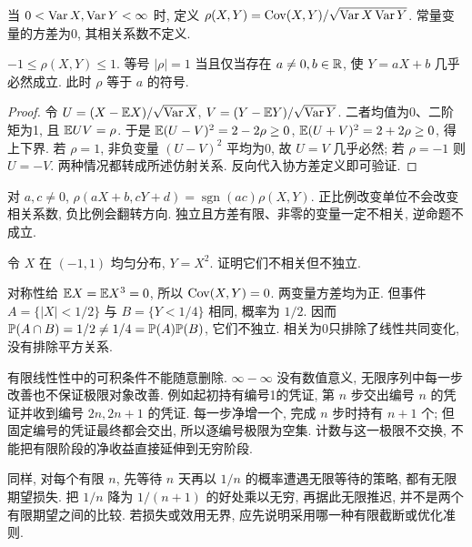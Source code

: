 \begin{definition}
当 $0<\operatorname{Var} X,\operatorname{Var} Y<\infty$ 时, 定义
$\rho(X,Y)=\operatorname{Cov}(X,Y)/\sqrt{\operatorname{Var} X\operatorname{Var} Y}$. 常量变量的方差为0, 其相关系数不定义.
\end{definition}
\begin{theorem}
$-1\le\rho(X,Y)\le1$. 等号 $|\rho|=1$ 当且仅当存在 $a\ne0,b\in\mathbb R$, 使 $Y=aX+b$ 几乎必然成立. 此时 $\rho$ 等于 $a$ 的符号.
\end{theorem}
\begin{proof}
令 $U=(X-\mathbb E X)/\sqrt{\operatorname{Var} X}$, $V=(Y-\mathbb E Y)/\sqrt{\operatorname{Var} Y}$. 二者均值为0、二阶矩为1, 且 $\mathbb E UV=\rho$. 于是 $\mathbb E(U-V)^2=2-2\rho\ge0$, $\mathbb E(U+V)^2=2+2\rho\ge0$, 得上下界. 若 $\rho=1$, 非负变量 $(U-V)^2$ 平均为0, 故 $U=V$ 几乎必然; 若 $\rho=-1$ 则 $U=-V$. 两种情况都转成所述仿射关系. 反向代入协方差定义即可验证.
\end{proof}
对 $a,c\ne0$, $\rho(aX+b,cY+d)=\operatorname{sgn}(ac)\rho(X,Y)$. 正比例改变单位不会改变相关系数, 负比例会翻转方向. 独立且方差有限、非零的变量一定不相关, 逆命题不成立.
\begin{example}
令 $X$ 在 $(-1,1)$ 均匀分布, $Y=X^2$. 证明它们不相关但不独立.
\end{example}
\begin{solution}
对称性给 $\mathbb E X=\mathbb E X^3=0$, 所以 $\operatorname{Cov}(X,Y)=0$. 两变量方差均为正. 但事件 $A=\{|X|<1/2\}$ 与 $B=\{Y<1/4\}$ 相同, 概率为 $1/2$. 因而 $\mathbb P(A\cap B)=1/2\ne1/4=\mathbb P(A)\mathbb P(B)$, 它们不独立. 相关为0只排除了线性共同变化, 没有排除平方关系.
\end{solution}

有限线性性中的可积条件不能随意删除. $\infty-\infty$ 没有数值意义, 无限序列中每一步改善也不保证极限对象改善. 例如起初持有编号1的凭证, 第 $n$ 步交出编号 $n$ 的凭证并收到编号 $2n,2n+1$ 的凭证. 每一步净增一个, 完成 $n$ 步时持有 $n+1$ 个; 但固定编号的凭证最终都会交出, 所以逐编号极限为空集. 计数与这一极限不交换, 不能把有限阶段的净收益直接延伸到无穷阶段.

同样, 对每个有限 $n$, 先等待 $n$ 天再以 $1/n$ 的概率遭遇无限等待的策略, 都有无限期望损失. 把 $1/n$ 降为 $1/(n+1)$ 的好处乘以无穷, 再据此无限推迟, 并不是两个有限期望之间的比较. 若损失或效用无界, 应先说明采用哪一种有限截断或优化准则.

